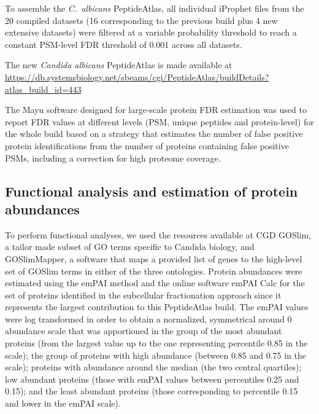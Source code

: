 To assemble the \textit{\mbox{C. albicans}} PeptideAtlas, all individual iProphet files from the 20 compiled
datasets (16 corresponding to the previous build plus 4 new extensive datasets) were filtered
at a variable probability threshold to reach a constant PSM-level FDR threshold of 0.001
across all datasets.


The new \textit{Candida albicans} PeptideAtlas is made available at \newline
\href{https://db.systemsbiology.net/sbeams/cgi/PeptideAtlas/buildDetails?atlas_build_id=443}{https://db.systemsbiology.net/sbeams/cgi/PeptideAtlas/buildDetails?atlas\_build\_id=443}
\linebreak

The Mayu \citep{Reiter2009} software designed for large-scale protein FDR estimation was used to report
FDR values at different levels (PSM, unique peptides and protein-level) for the whole build
based on a strategy that estimates the number of false positive protein identifications from
the number of proteins containing false positive PSMs, including a correction for high
proteome coverage.



\subsection*{Functional analysis and estimation of protein abundances}

To perform functional analyses, we used the resources available at CGD GOSlim, a tailor
made subset of GO terms specific to Candida biology, and GOSlimMapper, a software that
maps a provided list of genes to the high-level set of GOSlim terms in either of the three
ontologies.
Protein abundances were estimated using the emPAI method \citep{Ishihama2005} and the online software
emPAI Calc \citep{Shinoda2010} for the set of proteins identified in the subcellular fractionation approach
since it represents the largest contribution to this PeptideAtlas build. The emPAI values were
log transformed in order to obtain a normalized, symmetrical around 0 abundance scale that
was apportioned in the group of the most abundant proteins (from the largest value up to the
one representing percentile 0.85 in the scale); the group of proteins with high abundance
(between 0.85 and 0.75 in the scale); proteins with abundance around the median (the two
central quartiles); low abundant proteins (those with emPAI values between percentiles 0.25
and 0.15); and the least abundant proteins (those corresponding to percentile 0.15 and lower
in the emPAI scale).



